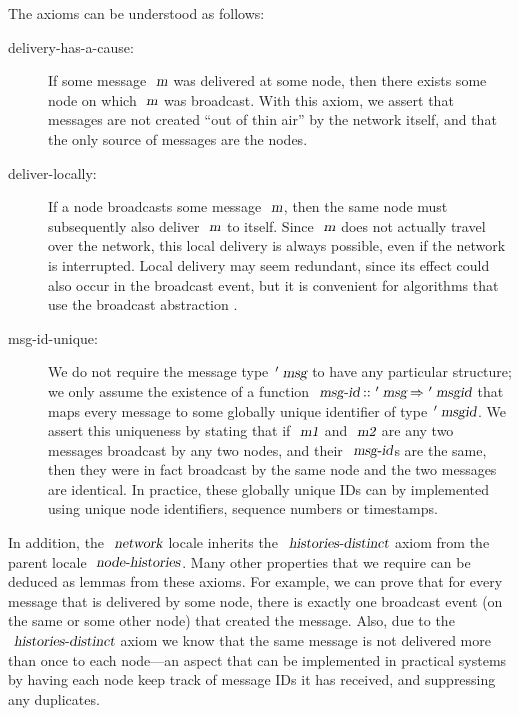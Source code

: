 \vspace{0.25em}
The axioms can be understood as follows:
\begin{description}
    \item[delivery-has-a-cause:] If some message $\isa{m}$ was delivered at some node, then there exists some node on which $\isa{m}$ was broadcast.
        With this axiom, we assert that messages are not created ``out of thin air'' by the network itself, and that the only source of messages are the nodes.
    \item[deliver-locally:] If a node broadcasts some message $\isa{m}$, then the same node must subsequently also deliver $\isa{m}$ to itself.
        Since $\isa{m}$ does not actually travel over the network, this local delivery is always possible, even if the network is interrupted.
        Local delivery may seem redundant, since its effect could also occur in the broadcast event, but it is convenient for algorithms that use the broadcast abstraction \cite{Cachin:2011wt}.
    \item[msg-id-unique:] We do not require the message type $\isacharprime\isa{msg}$ to have any particular structure; we only assume the existence of a function $\isa{msg-id} \mathbin{\isacharcolon\isacharcolon} \isacharprime\isa{msg} \mathbin{\isasymRightarrow} \isacharprime\isa{msgid}$ that maps every message to some globally unique identifier of type $\isacharprime\isa{msgid}$.
        We assert this uniqueness by stating that if $\isa{m1}$ and $\isa{m2}$ are any two messages broadcast by any two nodes, and their $\isa{msg-id}$s are the same, then they were in fact broadcast by the same node and the two messages are identical. 
        In practice, these globally unique IDs can by implemented using unique node identifiers, sequence numbers or timestamps.
\end{description}

In addition, the $\isa{network}$ locale inherits the $\isa{histories-distinct}$ axiom from the parent locale $\isa{node-histories}$.
Many other properties that we require can be deduced as lemmas from these axioms.
For example, we can prove that for every message that is delivered by some node, there is exactly one broadcast event (on the same or some other node) that created the message.
Also, due to the $\isa{histories-distinct}$ axiom we know that the same message is not delivered more than once to each node---an aspect that can be implemented in practical systems by having each node keep track of message IDs it has received, and suppressing any duplicates.

